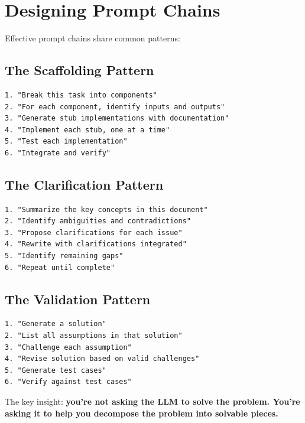 \chapter{Designing Prompt Chains}

Effective prompt chains share common patterns:

\section{The Scaffolding Pattern}

\begin{lstlisting}
1. "Break this task into components"
2. "For each component, identify inputs and outputs"
3. "Generate stub implementations with documentation"
4. "Implement each stub, one at a time"
5. "Test each implementation"
6. "Integrate and verify"
\end{lstlisting}

\section{The Clarification Pattern}

\begin{lstlisting}
1. "Summarize the key concepts in this document"
2. "Identify ambiguities and contradictions"
3. "Propose clarifications for each issue"
4. "Rewrite with clarifications integrated"
5. "Identify remaining gaps"
6. "Repeat until complete"
\end{lstlisting}

\section{The Validation Pattern}

\begin{lstlisting}
1. "Generate a solution"
2. "List all assumptions in that solution"
3. "Challenge each assumption"
4. "Revise solution based on valid challenges"
5. "Generate test cases"
6. "Verify against test cases"
\end{lstlisting}

The key insight: \textbf{you're not asking the LLM to solve the problem. You're asking it to help you decompose the problem into solvable pieces.}
